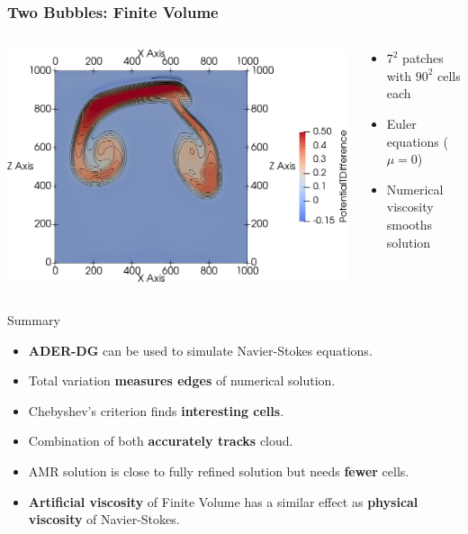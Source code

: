 \documentclass[aspectratio=169]{beamer}
\begin{document}
\begin{frame}
  \frametitle{Two Bubbles: Finite Volume}
  \begin{columns}
    \begin{column}{0.6\textwidth}
  \begin{center}
    \includegraphics[width=1.0\textwidth]{paper_two_bubbles_fv}
  \end{center}
    \end{column}
    \begin{column}{0.4\textwidth}
      \begin{itemize}
      \item $7^2$ patches with $90^2$ cells each
      \item Euler equations ($\mu = 0$)
      \item Numerical viscosity smooths solution
      \end{itemize}
    \end{column}
  \end{columns}
\end{frame}

\begin{frame}{Summary}
    \begin{itemize}
    \item \textbf{ADER-DG} can be used to simulate Navier-Stokes equations.
    \item Total variation \textbf{measures edges} of numerical solution.
    \item Chebyshev's criterion finds \textbf{interesting cells}.
    \item Combination of both \textbf{accurately tracks} cloud.
    \item AMR solution is close to fully refined solution but needs \textbf{fewer} cells.
    \item \textbf{Artificial viscosity} of Finite Volume has a similar effect as \textbf{physical viscosity} of Navier-Stokes.  
    \end{itemize}
\end{frame}
\end{document}
